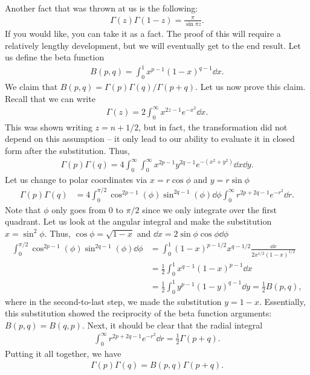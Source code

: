Another fact that was thrown at us is the following:
\begin{eqnarray}
    \label{eq:gamma-prod-sin}
    \Gamma(z) \Gamma(1-z) = \frac{\pi}{\sin{\pi z}}
.\end{eqnarray}
If you would like, you can take it as a fact.
The proof of this will require a relatively lengthy development, but we will eventually get to the end result.
Let us define the beta function
\begin{eqnarray}
    \label{eq:beta-def}
    B(p,q) = \int_{0}^{1} x^{p-1} (1-x)^{q-1} \dd{x}
.\end{eqnarray}
We claim that $B(p,q) = \Gamma(p)\Gamma(q)/\Gamma(p+q)$.
Let us now prove this claim.
Recall that we can write
\begin{eqnarray}
    \Gamma(z) = 2 \int_{0}^{\infty} x^{2z-1} e^{-x^2} \dd{x}
.\end{eqnarray}
This was shown writing $z = n + 1/2$, but in fact, the transformation did not depend on this assumption -- it only lead to our ability to evaluate it in closed form after the substitution.
Thus,
\begin{eqnarray}
    \Gamma(p)\Gamma(q) = 4 \int_{0}^{\infty} \int_{0}^{\infty} x^{2p-1} y^{2q-1} e^{-(x^2+y^2)} \dd{x} \dd{y}
.\end{eqnarray}
Let us change to polar coordinates via $x = r\cos{\phi}$ and $y = r\sin{\phi}$
\begin{align}
    \Gamma(p)\Gamma(q) &= 4 \int_{0}^{\pi/2} \cos^{2p-1}(\phi) \sin^{2q-1}(\phi) \dd{\phi} \int_{0}^{\infty} r^{2p+2q-1} e^{-r^2} \dd{r}
.\end{align}
Note that $\phi$ only goes from $0$ to $\pi/2$ since we only integrate over the first quadrant.
Let us look at the angular integral and make the substitution $x = \sin^2{\phi}$.
Thus, $\cos{\phi} = \sqrt{1 - x}$ and $\dd{x} = 2 \sin{\phi} \cos{\phi} \dd{\phi}$
\begin{align}
    \int_{0}^{\pi/2} \cos^{2p-1}(\phi) \sin^{2q-1}(\phi) \dd{\phi} &= \int_{0}^{1} (1-x)^{p-1/2} x^{q-1/2} \frac{\dd{x}}{2 x^{1/2} (1-x)^{1/2}} \nonumber \\
                                                                   &= \frac{1}{2} \int_{0}^{1} x^{q-1}(1-x)^{p-1} \dd{x} \nonumber \\
                                                                   &= \frac{1}{2} \int_{0}^{1} y^{p-1} (1 - y)^{q-1} \dd{y} = \frac{1}{2}B(p,q)
,\end{align}
where in the second-to-last step, we made the substitution $y = 1-x$.
Essentially, this substitution showed the reciprocity of the beta function arguments: $B(p,q) = B(q,p)$.
Next, it should be clear that the radial integral 
\begin{eqnarray}
    \int_{0}^{\infty} r^{2p+2q-1} e^{-r^2} \dd{r} = \frac{1}{2} \Gamma(p+q)
.\end{eqnarray}
Putting it all together, we have
\begin{eqnarray}
    \Gamma(p)\Gamma(q) = B(p,q) \Gamma(p+q)
.\end{eqnarray}

